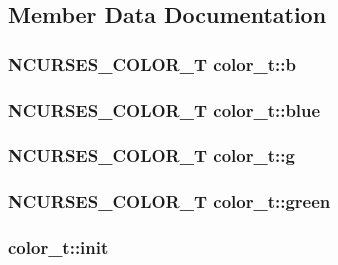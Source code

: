 \subsection{Member Data Documentation}
\hypertarget{structcolor__t_a499ea342d902c7c8455ef00f8b42af5d}{
\subsubsection[{b}]{\setlength{\rightskip}{0pt plus 5cm}N\-C\-U\-R\-S\-E\-S\-\_\-\-C\-O\-L\-O\-R\-\_\-\-T color\-\_\-t\-::b}}\label{structcolor__t_a499ea342d902c7c8455ef00f8b42af5d}
\hypertarget{structcolor__t_ab20dc19077d721888702d69473cd497b}{
\subsubsection[{blue}]{\setlength{\rightskip}{0pt plus 5cm}N\-C\-U\-R\-S\-E\-S\-\_\-\-C\-O\-L\-O\-R\-\_\-\-T color\-\_\-t\-::blue}}\label{structcolor__t_ab20dc19077d721888702d69473cd497b}
\hypertarget{structcolor__t_af312c600cc53f168993b945f9e899399}{
\subsubsection[{g}]{\setlength{\rightskip}{0pt plus 5cm}N\-C\-U\-R\-S\-E\-S\-\_\-\-C\-O\-L\-O\-R\-\_\-\-T color\-\_\-t\-::g}}\label{structcolor__t_af312c600cc53f168993b945f9e899399}
\hypertarget{structcolor__t_aa4210bb72e38bc6d7997eb8581901eff}{
\subsubsection[{green}]{\setlength{\rightskip}{0pt plus 5cm}N\-C\-U\-R\-S\-E\-S\-\_\-\-C\-O\-L\-O\-R\-\_\-\-T color\-\_\-t\-::green}}\label{structcolor__t_aa4210bb72e38bc6d7997eb8581901eff}
\hypertarget{structcolor__t_ab3f503ea9f8b4a26326e0ec326fbdea9}{
\subsubsection[{init}]{ color\-\_\-t\-::init}}\label{structcolor__t_ab3f503ea9f8b4a26326e0ec326fbdea9}
